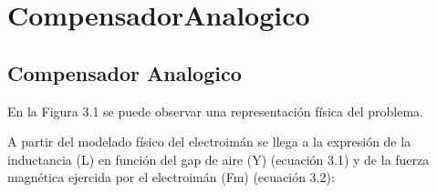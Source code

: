 \chapter{CompensadorAnalogico}  \label{cap:Compensador Analogico}

\section{Compensador Analogico}

En la Figura 3.1 se puede observar una representación física del problema.


A partir del modelado físico del electroimán se llega a la expresión de la inductancia (L) en función del gap de aire (Y) (ecuación 3.1) y de la fuerza magnética ejercida por el electroimán (Fm) (ecuación 3.2):


